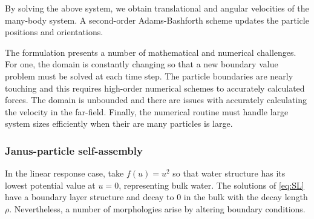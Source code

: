 By solving the above system, we obtain translational and angular
velocities of the many-body system. 
A second-order Adams-Bashforth scheme updates the particle positions and orientations.

The formulation presents a number of
mathematical and numerical challenges. For one, the domain is constantly
changing so that a new boundary value problem must be solved at each time step.
The particle boundaries are nearly touching and this requires
high-order numerical schemes to accurately calculated forces.
The domain is unbounded and there are issues with accurately
calculating the velocity in the far-field. 
Finally, the numerical routine must handle
large system sizes efficiently when their are many particles
is large. 


\subsubsection{Janus-particle self-assembly} 
In the linear response case,
take $f(u) = u^2$ so that water structure has its lowest potential value
at $u = 0$, representing bulk water. The solutions of \eqref{eq:SL} have
a boundary layer structure and decay to 0 in the bulk with the decay
length $\rho$. Nevertheless, a number of morphologies arise by altering
boundary conditions.


